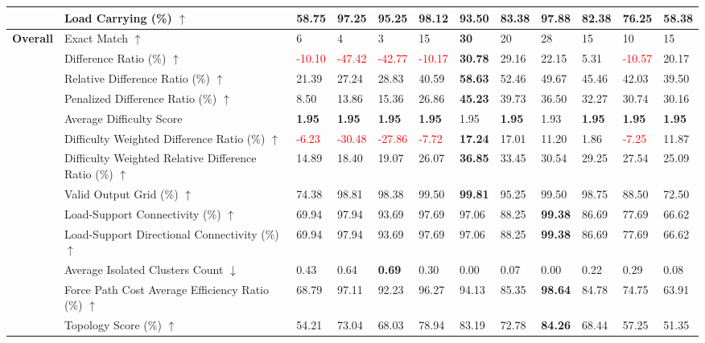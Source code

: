\begin{table}[!h]
{\begin{tabular}{llllllllllll}
 & Load Carrying (\%) $\uparrow$ & 58.75 & 97.25 & 95.25 & \textbf{98.12} & 93.50 & 83.38 & 97.88 & 82.38 & 76.25 & 58.38 \\
\midrule\midrule
\textbf{Overall} & Exact Match $\uparrow$ & 6 & 4 & 3 & 15 & \textbf{30} & 20 & 28 & 15 & 10 & 15 \\
 & Difference Ratio (\%) $\uparrow$ & \textcolor{red}{-10.10} & \textcolor{red}{-47.42} & \textcolor{red}{-42.77} & \textcolor{red}{-10.17} & \textbf{30.78} & 29.16 & 22.15 & 5.31 & \textcolor{red}{-10.57} & 20.17 \\
 & Relative Difference Ratio (\%) $\uparrow$ & 21.39 & 27.24 & 28.83 & 40.59 & \textbf{58.63} & 52.46 & 49.67 & 45.46 & 42.03 & 39.50 \\
 & Penalized Difference Ratio (\%) $\uparrow$ & 8.50 & 13.86 & 15.36 & 26.86 & \textbf{45.23} & 39.73 & 36.50 & 32.27 & 30.74 & 30.16 \\
 & Average Difficulty Score & \textbf{1.95} & \textbf{1.95} & \textbf{1.95} & \textbf{1.95} & 1.95 & \textbf{1.95} & 1.93 & \textbf{1.95} & \textbf{1.95} & \textbf{1.95} \\
 & Difficulty Weighted Difference Ratio (\%) $\uparrow$ & \textcolor{red}{-6.23} & \textcolor{red}{-30.48} & \textcolor{red}{-27.86} & \textcolor{red}{-7.72} & \textbf{17.24} & 17.01 & 11.20 & 1.86 & \textcolor{red}{-7.25} & 11.87 \\
 & Difficulty Weighted Relative Difference Ratio (\%) $\uparrow$ & 14.89 & 18.40 & 19.07 & 26.07 & \textbf{36.85} & 33.45 & 30.54 & 29.25 & 27.54 & 25.09 \\
 & Valid Output Grid (\%) $\uparrow$ & 74.38 & 98.81 & 98.38 & 99.50 & \textbf{99.81} & 95.25 & 99.50 & 98.75 & 88.50 & 72.50 \\
 & Load-Support Connectivity (\%) $\uparrow$ & 69.94 & 97.94 & 93.69 & 97.69 & 97.06 & 88.25 & \textbf{99.38} & 86.69 & 77.69 & 66.62 \\
 & Load-Support Directional Connectivity (\%) $\uparrow$ & 69.94 & 97.94 & 93.69 & 97.69 & 97.06 & 88.25 & \textbf{99.38} & 86.69 & 77.69 & 66.62 \\
 & Average Isolated Clusters Count $\downarrow$ & 0.43 & 0.64 & \textbf{0.69} & 0.30 & 0.00 & 0.07 & 0.00 & 0.22 & 0.29 & 0.08 \\
 & Force Path Cost Average Efficiency Ratio (\%) $\uparrow$ & 68.79 & 97.11 & 92.23 & 96.27 & 94.13 & 85.35 & \textbf{98.64} & 84.78 & 74.75 & 63.91 \\
 & Topology Score (\%) $\uparrow$ & 54.21 & 73.04 & 68.03 & 78.94 & 83.19 & 72.78 & \textbf{84.26} & 68.44 & 57.25 & 51.35 \\

\end{tabular}}
\end{table}
